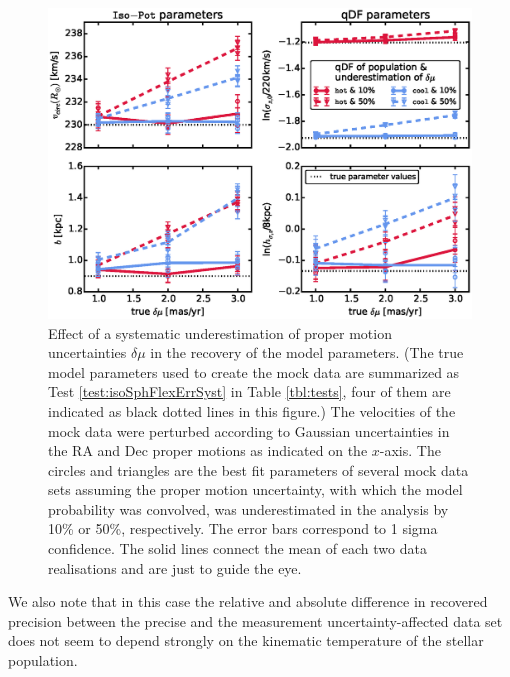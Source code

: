 \begin{figure}[!htbp]
\centering
\includegraphics[width=\columnwidth]{figs/isoSphFlexErrSyst_offset_vs_error.eps}
\caption{Effect of a systematic underestimation of proper motion uncertainties $\delta \mu$ in the recovery of the model parameters. (The true model parameters used to create the mock data are summarized as Test \ref{test:isoSphFlexErrSyst} in Table \ref{tbl:tests}, four of them are indicated as black dotted lines in this figure.) The velocities of the mock data were perturbed according to Gaussian uncertainties in the RA and Dec proper motions as indicated on the $x$-axis. The circles and triangles are the best fit parameters of several mock data sets assuming the proper motion uncertainty, with which the model probability was convolved, was underestimated in the analysis by 10\% or 50\%, respectively. The error bars correspond to 1 sigma confidence. The solid lines connect the mean of each two data realisations and are just to guide the eye. }
\label{fig:isoSphFlexErrSyst}
\end{figure}



We also note that in this case the relative and absolute difference in recovered precision between the precise and the measurement uncertainty-affected data set does not seem to depend strongly on the kinematic temperature of the stellar population.

